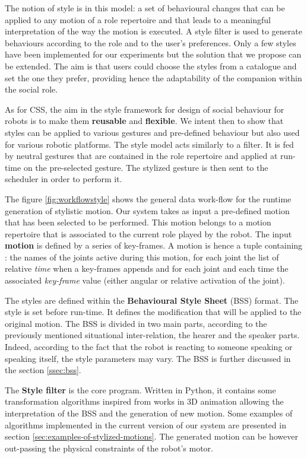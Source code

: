 \documentclass[smallextended]{svjour3}
\begin{document}
The notion of style is in this model: a set of behavioural changes that can be applied to any motion of a role repertoire and that leads to a meaningful interpretation of the way the motion is executed. 
A style filter is used to generate behaviours according to the role and to the user's preferences. 
Only a few styles have been implemented for our experiments but the solution that we propose can be extended.
The aim is that users could choose the styles from a catalogue and set the one they prefer, providing hence the adaptability of the companion within the social role. 

As for CSS, the aim in the style framework for design of social behaviour for robots is to make them \textbf{reusable }and \textbf{flexible}.
We intent then to show that styles can be applied to various gestures and pre-defined behaviour but also used for various robotic platforms. 
The style model acts similarly to a filter. 
It is fed by neutral gestures that are contained in the role repertoire and applied at run-time on the pre-selected gesture. 
The stylized gesture is then sent to the scheduler in order to perform it.

The figure \ref{fig:workflowstyle} shows the general data work-flow for the runtime generation of stylistic motion.
Our system takes as input a pre-defined motion that has been selected to be performed. 
This motion belongs to a motion repertoire that is associated to the current role played by the robot.
The input \textbf{motion} is defined by a series of key-frames.
A motion is hence a tuple containing : 
the names of the joints active during this motion,
for each joint the list of relative \textit{time} when a key-frames appends and for each joint and each time the associated \textit{key-frame} value (either angular or relative activation of the joint).

The styles are defined within the \textbf{Behavioural Style Sheet} (BSS) format. 
The style is set before run-time. 
It defines the modification that will be applied to the original motion.
The BSS is divided in two main parts, according to the previously mentioned situational inter-relation, the hearer and the speaker parts.
Indeed,  according to the fact that the robot is reacting to someone speaking or speaking itself, the style parameters may vary.
The BSS is further discussed in the section \ref{ssec:bss}.

The \textbf{Style filter} is the core program. 
Written in Python, it contains some transformation algorithms inspired from works in 3D animation allowing the interpretation of the BSS and the generation of new motion.
Some examples of algorithms implemented in the current version of our system are presented in section \ref{sec:examples-of-stylized-motions}.
The generated motion can be however out-passing the physical constraints of the robot's motor. 
\end{document}
